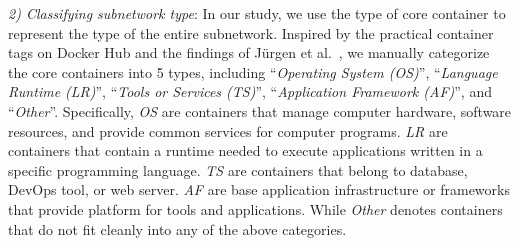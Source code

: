 \documentclass[sigconf]{acmart}
\begin{document}




\noindent\emph{2) Classifying subnetwork type}: 
In our study, we use the type of core container to represent the type of the entire subnetwork. 
Inspired by the practical container tags on Docker Hub and the findings of Jürgen et al.~\cite{cito2017empirical}, we manually categorize the core containers into 5 types, including ``\emph{Operating System (OS)}'', ``\emph{Language Runtime (LR)}'', ``\emph{Tools or Services (TS)}'', ``\emph{Application Framework (AF)}'', and ``\emph{Other}''. 
Specifically, \emph{OS} are containers that manage computer hardware, software resources, and provide common services for computer programs. \emph{LR} are containers that contain a runtime needed to execute applications written in a specific programming language. 
\emph{TS} are containers that belong to database, DevOps tool, or web server. \emph{AF} are base application infrastructure or frameworks that provide platform for tools and applications. While \emph{Other} denotes containers that do not fit cleanly into any of the above categories.%
\end{document}
